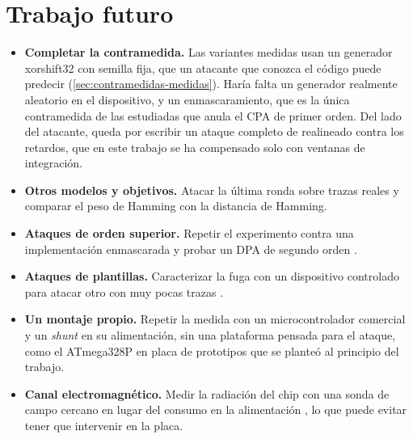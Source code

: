 \section{Trabajo futuro}
\label{sec:trabajo-futuro}

\begin{itemize}
  \item \textbf{Completar la contramedida.} Las variantes medidas usan un
    generador xorshift32 con semilla fija, que un atacante que conozca el
    código puede predecir (\cref{sec:contramedidas-medidas}). Haría falta un
    generador realmente aleatorio en el dispositivo, y un enmascaramiento, que
    es la única contramedida de las estudiadas que anula el CPA de primer
    orden. Del lado del atacante, queda por escribir un ataque completo de
    realineado contra los retardos, que en este trabajo se ha compensado solo
    con ventanas de integración.
  \item \textbf{Otros modelos y objetivos.} Atacar la última ronda sobre trazas
    reales y comparar el peso de Hamming con la distancia de Hamming.
  \item \textbf{Ataques de orden superior.} Repetir el experimento contra una
    implementación enmascarada y probar un DPA de segundo orden
    \cite{messerges2000second}.
  \item \textbf{Ataques de plantillas.} Caracterizar la fuga con un dispositivo
    controlado para atacar otro con muy pocas trazas
    \cite[sec.~II.B.4]{mishra2025modern}.
  \item \textbf{Un montaje propio.} Repetir la medida con un microcontrolador
    comercial y un \emph{shunt} en su alimentación, sin una plataforma pensada
    para el ataque, como el ATmega328P en placa de prototipos que se planteó al
    principio del trabajo.
  \item \textbf{Canal electromagnético.} Medir la radiación del chip con una
    sonda de campo cercano en lugar del consumo en la alimentación
    \cite[sec.~II.B]{mishra2025modern}, lo que puede evitar tener que
    intervenir en la placa.
\end{itemize}
